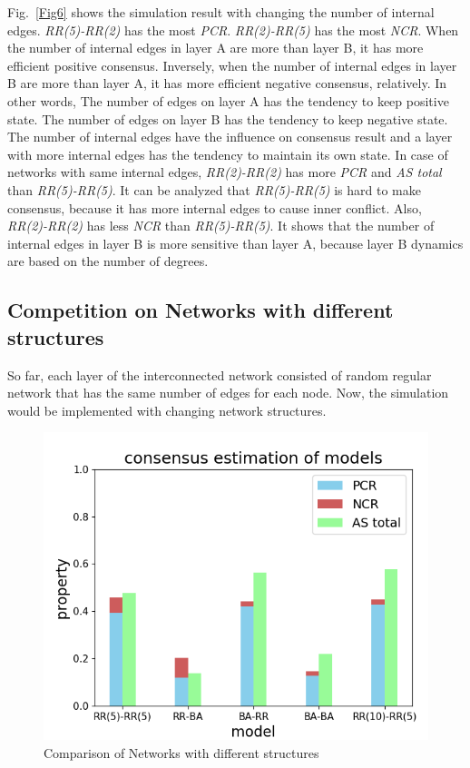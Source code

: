 \documentclass[english]{cccconf}
\begin{document}
Fig.~\ref{Fig6} shows the simulation result with changing the number of internal edges. \textit{RR(5)-RR(2)} has the most \textit{PCR}. \textit{RR(2)-RR(5)} has the most \textit{NCR}. When the number of internal edges in layer A are more than layer B, it has more efficient positive consensus. Inversely, when the number of internal edges in layer B are more than layer A, it has more efficient negative consensus, relatively. In other words, The number of edges on layer A has the tendency to keep positive state. The number of edges on layer B has the tendency to keep negative state. The number of internal edges have the influence on consensus result and a layer with more internal edges has the tendency to maintain its own state. In case of networks with same internal edges, \textit{RR(2)-RR(2)} has more \textit{PCR} and \textit{AS total} than \textit{RR(5)-RR(5)}. It can be analyzed that \textit{RR(5)-RR(5)} is hard to make consensus, because it has more internal edges to cause inner conflict. Also, \textit{RR(2)-RR(2)} has less \textit{NCR} than \textit{RR(5)-RR(5)}. It shows that the number of internal edges in layer B is more sensitive than layer A, because layer B dynamics are based on the number of degrees.   

\subsection{Competition on Networks with different structures}
So far, each layer of the interconnected network consisted of random regular network that has the same number of edges for each node. Now, the simulation would be implemented with changing network structures. 

\begin{figure}[!htb]
	\centering
	\includegraphics[width=\hsize]{FIG7.png}
	\caption{Comparison of Networks with different structures}
	\label{Fig7}
\end{figure}
\end{document}
